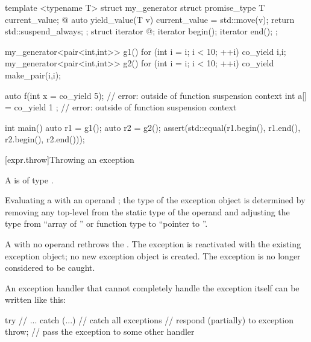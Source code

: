 \begin{example}
\begin{codeblock}
template <typename T>
struct my_generator {
  struct promise_type {
    T current_value;
    @\commentellip@
    auto yield_value(T v) {
      current_value = std::move(v);
      return std::suspend_always{};
    }
  };
  struct iterator { @\commentellip@ };
  iterator begin();
  iterator end();
};

my_generator<pair<int,int>> g1() {
  for (int i = i; i < 10; ++i) co_yield {i,i};
}
my_generator<pair<int,int>> g2() {
  for (int i = i; i < 10; ++i) co_yield make_pair(i,i);
}

auto f(int x = co_yield 5);     // error:  outside of function suspension context
int a[] = { co_yield 1 };       // error:  outside of function suspension context

int main() {
  auto r1 = g1();
  auto r2 = g2();
  assert(std::equal(r1.begin(), r1.end(), r2.begin(), r2.end()));
}
\end{codeblock}
\end{example}

[expr.throw]{Throwing an exception}%
%
%
%
\begin{bnf}
\br
      
\end{bnf}

\pnum
A  is of type .

\pnum
Evaluating a  with an operand ; the type of the exception object is determined by removing
any top-level  from the static type of the
operand and adjusting the type
from ``array of '' or function type 
to ``pointer to ''.

\pnum
{}%
A
with no operand rethrows the
.
The exception is reactivated with the existing exception object;
no new exception object is created.
The exception is no longer considered to be caught.
\begin{example}
An exception handler that cannot completely handle the exception itself
can be written like this:
\begin{codeblock}
try {
  // ...
} catch (...) {     // catch all exceptions
  // respond (partially) to exception
  throw;            // pass the exception to some other handler
}
\end{codeblock}
\end{example}

